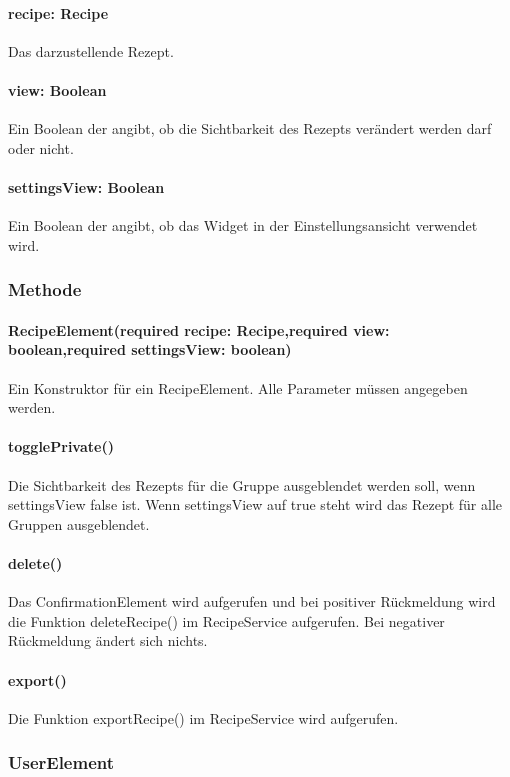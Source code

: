 \documentclass[parskip=full]{scrartcl}
\begin{document}
            \paragraph*{recipe: Recipe} Das darzustellende Rezept.
            \paragraph*{view: Boolean} Ein Boolean der angibt, ob die Sichtbarkeit des Rezepts verändert werden darf oder nicht.
            \paragraph*{settingsView: Boolean} Ein Boolean der angibt, ob das Widget in der Einstellungsansicht verwendet wird.

        \subsubsection*{Methode}
            \paragraph*{RecipeElement(required recipe: Recipe,required view: boolean,required settingsView: boolean)} Ein Konstruktor für ein RecipeElement. Alle Parameter müssen angegeben werden.
            \paragraph*{togglePrivate()} Die Sichtbarkeit des Rezepts für die Gruppe ausgeblendet werden soll, wenn settingsView false ist. Wenn settingsView auf true steht wird das Rezept für alle Gruppen ausgeblendet.
            \paragraph*{delete()} Das ConfirmationElement wird aufgerufen und bei positiver Rückmeldung wird die Funktion deleteRecipe() im RecipeService aufgerufen. Bei negativer Rückmeldung ändert sich nichts.
            \paragraph*{export()} Die Funktion exportRecipe() im RecipeService wird aufgerufen.

    \subsubsection{UserElement} 
\end{document}
